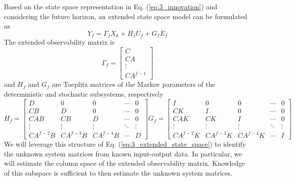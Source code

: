 Based on the state space representation in Eq. (\ref{eq:3_innovation}) and considering the future horizon, an extended state space model can be formulated as
\begin{equation}\label{eq:3_extended_state_space}
Y_f = \Gamma_f X_k + H_f U_f + G_f E_f
\end{equation}
The extended observability matrix is
\begin{equation}\label{eq:3_extended_observability}
\Gamma_f = \begin{bmatrix}C\\ CA\\ \vdots\\ CA^{f-1}\end{bmatrix}
\end{equation}
and $H_f$ and $G_f$ are Toeplitz matrices of the Markov parameters of the deterministic and stochastic subsystems, respectively
\begin{subequations}\label{eq:3_toeplitz}
\begin{equation}
H_f = \begin{bmatrix}
D & 0 & 0 & \cdots & 0\\
CB & D & 0 & \cdots & 0\\
CAB & CB & D & \cdots & 0\\
\vdots & \vdots  & \vdots & \ddots & \vdots\\
CA^{f-2}B & CA^{f-3}B & CA^{f-4}B & \cdots & D
\end{bmatrix}
\end{equation}
\begin{equation}
G_f = \begin{bmatrix}
I & 0 & 0 & \cdots & 0\\
CK & I & 0 & \cdots & 0\\
CAK & CK & I & \cdots & 0\\
\vdots & \vdots  & \vdots & \ddots & \vdots\\
CA^{f-2}K & CA^{f-3}K & CA^{f-4}K & \cdots & I
\end{bmatrix}
\end{equation}
\end{subequations}
We will leverage this structure of Eq. (\ref{eq:3_extended_state_space}) to identify the unknown system matrices from known input-output data. In particular, we will estimate the column space of the extended observability matrix. Knowledge of this subspace is sufficient to then estimate the unknown system matrices. 


